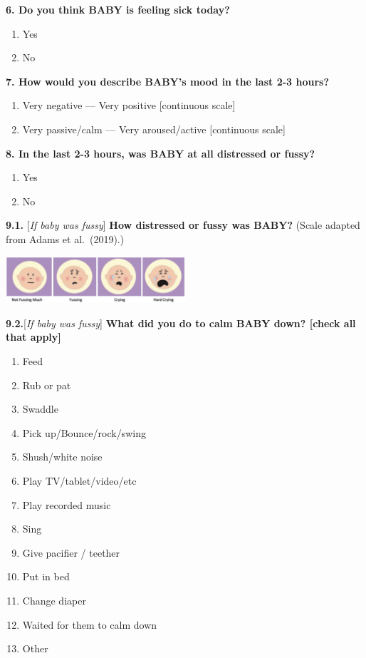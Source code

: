 \documentclass[
]{article}
\providecommand{\tightlist}{%
  \setlength{\itemsep}{0pt}\setlength{\parskip}{0pt}}
\begin{document}
\textbf{6. Do you think BABY is feeling sick today?}

\begin{enumerate}
\def\labelenumi{\arabic{enumi}.}
\tightlist
\item
  Yes
\item
  No
\end{enumerate}

\textbf{7. How would you describe BABY's mood in the last 2-3 hours?}

\begin{enumerate}
\def\labelenumi{\alph{enumi}.}
\tightlist
\item
  Very negative --- Very positive {[}continuous scale{]}
\item
  Very passive/calm --- Very aroused/active {[}continuous scale{]}
\end{enumerate}

\textbf{8. In the last 2-3 hours, was BABY at all distressed or fussy?}

\begin{enumerate}
\def\labelenumi{\alph{enumi}.}
\tightlist
\item
  Yes
\item
  No
\end{enumerate}

\textbf{9.1.} {[}\emph{If baby was fussy}{]} \textbf{How distressed or
fussy was BABY?} (Scale adapted from Adams et al.~(2019).)

\includegraphics[width=0.5\textwidth,height=\textheight]{../viz/adams_scale.png}

\textbf{9.2.}{[}\emph{If baby was fussy}{]} \textbf{What did you do to
calm BABY down? {[}check all that apply{]}}

\begin{enumerate}
\def\labelenumi{\alph{enumi}.}
\tightlist
\item
  Feed
\item
  Rub or pat
\item
  Swaddle
\item
  Pick up/Bounce/rock/swing
\item
  Shush/white noise
\item
  Play TV/tablet/video/etc
\item
  Play recorded music
\item
  Sing
\item
  Give pacifier / teether
\item
  Put in bed
\item
  Change diaper
\item
  Waited for them to calm down
\item
  Other
\end{enumerate}
\end{document}
